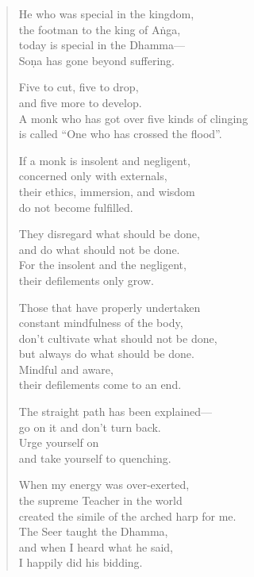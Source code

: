 \documentclass[12pt,openany]{book}%
\begin{document}
\begin{verse}%
He who was special in the kingdom, \\
the footman to the king of \textsanskrit{Aṅga}, \\
today is special in the Dhamma—\\
\textsanskrit{Soṇa} has gone beyond suffering. 

Five to cut, five to drop, \\
and five more to develop. \\
A monk who has got over five kinds of clinging \\
is called “One who has crossed the flood”. 

If a monk is insolent and negligent, \\
concerned only with externals, \\
their ethics, immersion, and wisdom \\
do not become fulfilled. 

They disregard what should be done, \\
and do what should not be done. \\
For the insolent and the negligent, \\
their defilements only grow. 

Those that have properly undertaken \\
constant mindfulness of the body, \\
don’t cultivate what should not be done, \\
but always do what should be done. \\
Mindful and aware, \\
their defilements come to an end. 

The straight path has been explained—\\
go on it and don’t turn back. \\
Urge yourself on \\
and take yourself to quenching. 

When my energy was over-exerted, \\
the supreme Teacher in the world \\
created the simile of the arched harp for me. \\
The Seer taught the Dhamma, \\
and when I heard what he said, \\
I happily did his bidding. 


\end{verse}
\end{document}
